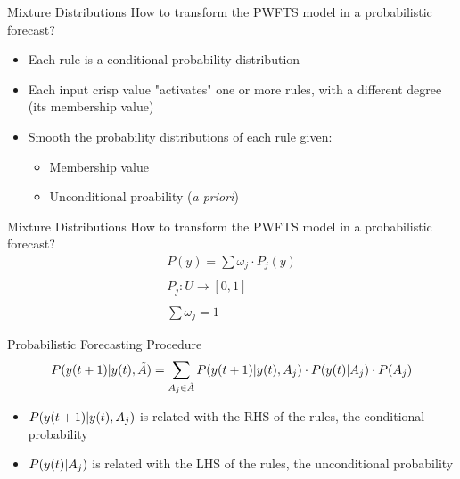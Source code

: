 \documentclass{beamer}
\begin{document}

\begin{frame}{Mixture Distributions}
\linespread{1.5}
How to transform the PWFTS model in a probabilistic forecast?
\begin{itemize}
    \item Each rule is a conditional probability distribution
    \item Each input crisp value "activates" one or more rules, with a different degree (its membership value)
    \item Smooth the probability distributions of each rule given:
    \begin{itemize}
        \item Membership value
        \item Unconditional proability (\textit{a priori})
    \end{itemize}
\end{itemize}
\end{frame}

\note[itemize]{
    \item
}

\begin{frame}{Mixture Distributions}
How to transform the PWFTS model in a probabilistic forecast?
$$
\begin{array}{c}
     P(y) = \sum \omega_j \cdot P_j(y)  \\
     \\
     P_j: U \rightarrow [0,1] \\ 
     \\
     \sum \omega_j = 1
\end{array}
$$
\end{frame}


\begin{frame}{Probabilistic Forecasting Procedure}
\linespread{2}
$$P(y(t+1)|y(t),\tilde{A}) = \sum_{A_j \in \tilde{A}} P(y(t+1)|y(t),A_j)\cdot P(y(t)|A_j)\cdot P(A_j)$$
\begin{itemize}
    \item $P(y(t+1)|y(t),A_j)$ is related with the RHS of the rules, the conditional probability 
    \item $P(y(t)|A_j)$ is related with the LHS of the rules, the unconditional probability
\end{itemize}
\end{frame}
\end{document}
